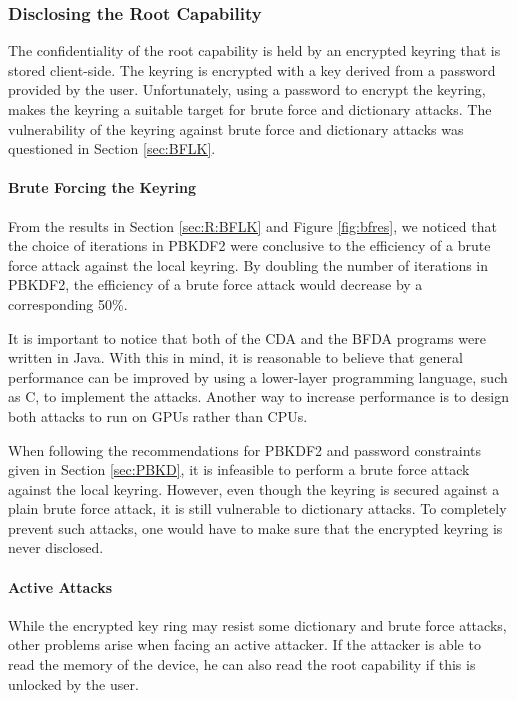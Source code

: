 \documentclass[pdftex,english,10pt,b5paper,twoside]{book}
\begin{document}
\subsubsection{Disclosing the Root Capability}

The confidentiality of the root capability is held by an encrypted keyring that
is stored client-side. The keyring is encrypted with a key derived from a
password provided by the user. Unfortunately, using a password to encrypt the
keyring, makes the keyring a suitable target for brute force and dictionary
attacks. The vulnerability of the keyring against brute force and dictionary
attacks was questioned in Section \ref{sec:BFLK}.

\paragraph{Brute Forcing the Keyring} From the results in Section
\ref{sec:R:BFLK} and Figure \ref{fig:bfres}, we noticed that the choice of
iterations in \ac{PBKDF2} were conclusive to the efficiency of a brute force
attack against the local keyring. By doubling the number of iterations in
\ac{PBKDF2}, the efficiency of a brute force attack would decrease by a
corresponding 50\%.



It is important to notice that both of the \ac{CDA} and the \ac{BFDA} programs
were written in Java. With this in mind, it is reasonable to believe that
general performance can be improved by using a lower-layer programming
language, such as C, to implement the attacks. Another way to increase
performance is to design both attacks to run on \acp{GPU} rather than
\acp{CPU}.

When following the recommendations for \ac{PBKDF2} and password constraints
given in Section \ref{sec:PBKD}, it is infeasible to perform a brute force
attack against the local keyring. However, even though the keyring is secured
against a plain brute force attack, it is still vulnerable to dictionary
attacks. To completely prevent such attacks, one would have to make sure that
the encrypted keyring is never disclosed.

\paragraph{Active Attacks}

While the encrypted key ring may resist some dictionary and brute force
attacks, other problems arise when facing an active attacker. If the attacker
is able to read the memory of the device, he can also read the root capability
if this is unlocked by the user.
\end{document}
